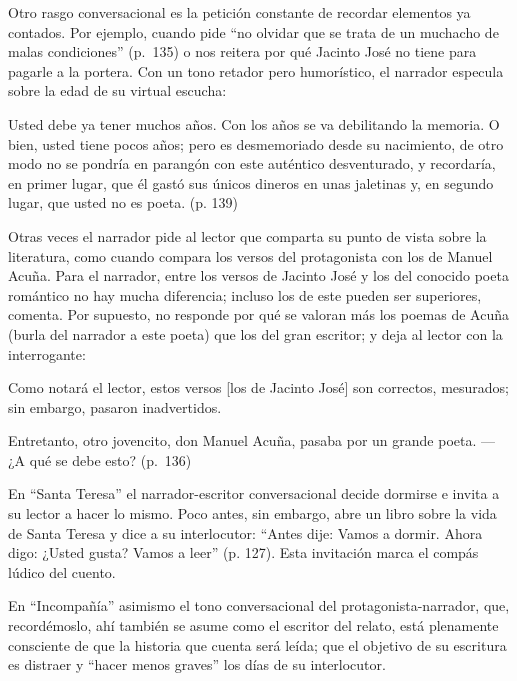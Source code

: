 \documentclass[14pt,twoside,final]{extbook} %
\begin{document}
Otro rasgo conversacional es la petición constante de recordar elementos ya contados. Por ejemplo, cuando pide ``no olvidar que se trata de un muchacho de malas condiciones'' (p.~135) o nos reitera por qué Jacinto José no tiene para pagarle a la portera. Con un tono retador pero humorístico, el narrador especula sobre la edad de su virtual escucha:
\begin{quoting}
Usted debe ya tener muchos años. Con los años se va debilitando la memoria. O bien, usted tiene pocos años; pero es desmemoriado desde su nacimiento, de otro modo no se pondría en parangón con este auténtico desventurado, y recordaría, en primer lugar, que él gastó sus únicos dineros en unas jaletinas y, en segundo lugar, que usted no es poeta. (p. 139)
\end{quoting}
Otras veces el narrador pide al lector que comparta su punto de vista sobre la literatura, como cuando compara los versos del protagonista con los de Manuel Acuña. Para el narrador, entre los versos de Jacinto José y los del conocido poeta romántico no hay mucha diferencia; incluso los de este pueden ser superiores, comenta. Por supuesto, no responde por qué se valoran más los poemas de Acuña (burla del narrador a este poeta) que los del gran escritor; y deja al lector con la interrogante:
\begin{quoting}
Como notará el lector, estos versos [los de Jacinto José] son correctos, mesurados; sin embargo, pasaron inadvertidos.

Entretanto, otro jovencito, don Manuel Acuña, pasaba por un grande poeta. ---¿A qué se debe esto? (p.~136)
\end{quoting}
En ``Santa Teresa'' el narrador-escritor conversacional decide dormirse e invita a su lector a hacer lo mismo. Poco antes, sin embargo, abre un libro sobre la vida de Santa Teresa y dice a su interlocutor: ``Antes dije: Vamos a dormir. Ahora digo: ¿Usted gusta? Vamos a leer'' (p. 127). Esta invitación marca el compás lúdico del cuento.

En ``Incompañía'' asimismo el tono conversacional del protagonista-narrador, que, recordémoslo, ahí también se asume como el escritor del relato, está plenamente consciente de que la historia que cuenta será leída; que el objetivo de su escritura es distraer y ``hacer menos graves'' los días de su interlocutor.
\end{document}
